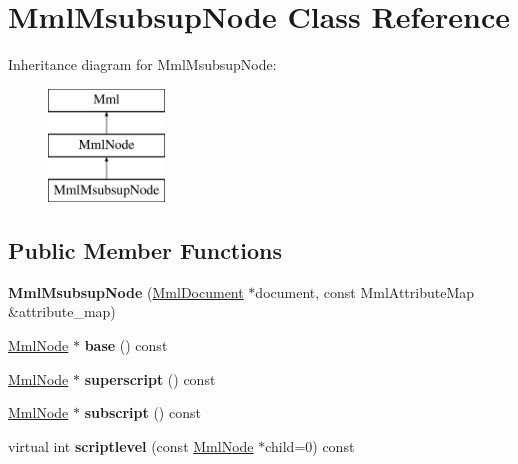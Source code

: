 \hypertarget{class_mml_msubsup_node}{}\section{Mml\+Msubsup\+Node Class Reference}
\label{class_mml_msubsup_node}
Inheritance diagram for Mml\+Msubsup\+Node\+:\begin{figure}[H]
\begin{center}
\leavevmode
\includegraphics[height=3.000000cm]{class_mml_msubsup_node}
\end{center}
\end{figure}
\subsection*{Public Member Functions}
\begin{DoxyCompactItemize}
\item 
\mbox{\label{class_mml_msubsup_node_ab48137f49d4eabad4c6c1bb61cd44ae5}} 
{\bfseries Mml\+Msubsup\+Node} (\mbox{\hyperlink{class_mml_document}{Mml\+Document}} $\ast$document, const Mml\+Attribute\+Map \&attribute\+\_\+map)
\item 
\mbox{\label{class_mml_msubsup_node_a43939c56ff9db101704fd828aaa69ea8}} 
\mbox{\hyperlink{class_mml_node}{Mml\+Node}} $\ast$ {\bfseries base} () const
\item 
\mbox{\label{class_mml_msubsup_node_a7a43b620c43575cdac5f613c6e6e4c17}} 
\mbox{\hyperlink{class_mml_node}{Mml\+Node}} $\ast$ {\bfseries superscript} () const
\item 
\mbox{\label{class_mml_msubsup_node_a95d2774f873faf1b8282da94758bfbb1}} 
\mbox{\hyperlink{class_mml_node}{Mml\+Node}} $\ast$ {\bfseries subscript} () const
\item 
\mbox{\label{class_mml_msubsup_node_a0193e35ad280accda5126d1b67b5d031}} 
virtual int {\bfseries scriptlevel} (const \mbox{\hyperlink{class_mml_node}{Mml\+Node}} $\ast$child=0) const
\end{DoxyCompactItemize}

